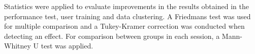 Statistics were applied to evaluate improvements in the results obtained in the performance test, user training and data clustering. A Friedmans test was used for multiple comparison and a Tukey-Kramer correction was conducted when detecting an effect. For comparison between groups in each session, a Mann-Whitney U test was applied.